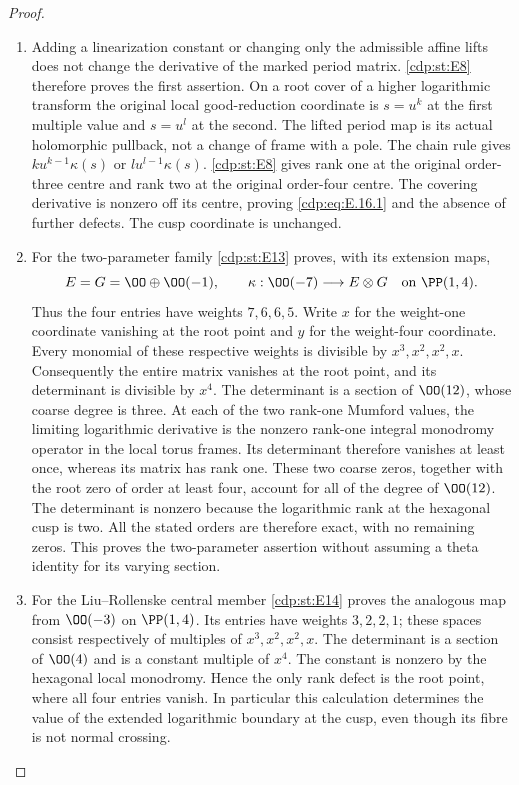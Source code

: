 \begin{proof}

\begin{enumerate}[label={$\langle1\rangle$\arabic*.},leftmargin=*]
\item Adding a linearization constant or changing only the admissible affine lifts does not change the derivative of the marked period matrix. \ref{cdp:st:E8} therefore proves the first assertion. On a root cover of a higher logarithmic transform the original local good-reduction coordinate is $s=u^k$ at the first multiple value and $s=u^l$ at the second. The lifted period map is its actual holomorphic pullback, not a change of frame with a pole. The chain rule gives $k u^{k-1}\kappa(s)$ or $l u^{l-1}\kappa(s)$. \ref{cdp:st:E8} gives rank one at the original order-three centre and rank two at the original order-four centre. The covering derivative is nonzero off its centre, proving \eqref{cdp:eq:E.16.1} and the absence of further defects. The cusp coordinate is unchanged.

\item For the two-parameter family \ref{cdp:st:E13} proves, with its extension maps,
\[
 E=G=\OO\oplus\OO(-1),\qquad
 \kappa:\OO(-7)\longrightarrow E\otimes G
 \quad\text{on }\PP(1,4).
\]
Thus the four entries have weights $7,6,6,5$. Write $x$ for the weight-one coordinate vanishing at the root point and $y$ for the weight-four coordinate. Every monomial of these respective weights is divisible by $x^3,x^2,x^2,x$. Consequently the entire matrix vanishes at the root point, and its determinant is divisible by $x^4$. The determinant is a section of $\OO(12)$, whose coarse degree is three. At each of the two rank-one Mumford values, the limiting logarithmic derivative is the nonzero rank-one integral monodromy operator in the local torus frames. Its determinant therefore vanishes at least once, whereas its matrix has rank one. These two coarse zeros, together with the root zero of order at least four, account for all of the degree of $\OO(12)$. The determinant is nonzero because the logarithmic rank at the hexagonal cusp is two. All the stated orders are therefore exact, with no remaining zeros. This proves the two-parameter assertion without assuming a theta identity for its varying section.

\item For the Liu--Rollenske central member \ref{cdp:st:E14} proves the analogous map from $\OO(-3)$ on $\PP(1,4)$. Its entries have weights $3,2,2,1$; these spaces consist respectively of multiples of $x^3,x^2,x^2,x$. The determinant is a section of $\OO(4)$ and is a constant multiple of $x^4$. The constant is nonzero by the hexagonal local monodromy. Hence the only rank defect is the root point, where all four entries vanish. In particular this calculation determines the value of the extended logarithmic boundary at the cusp, even though its fibre is not normal crossing.


\end{enumerate}
\end{proof}

